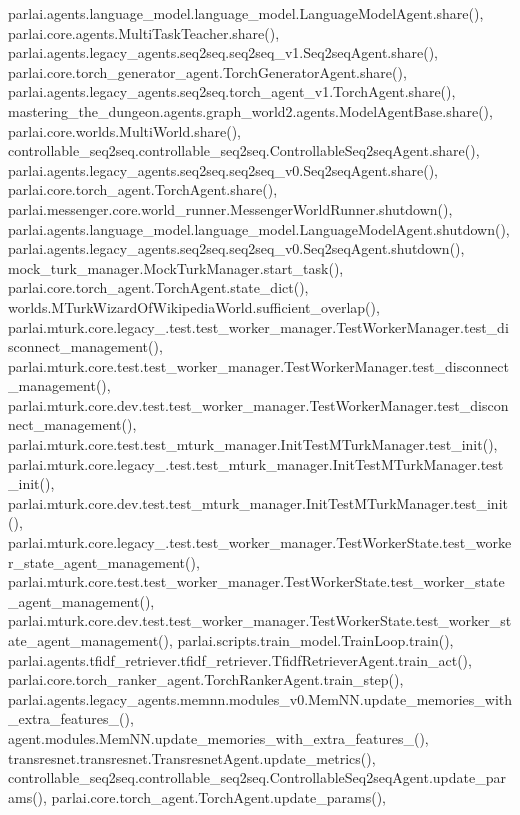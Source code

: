 parlai.\+agents.\+language\+\_\+model.\+language\+\_\+model.\+Language\+Model\+Agent.\+share(), parlai.\+core.\+agents.\+Multi\+Task\+Teacher.\+share(), parlai.\+agents.\+legacy\+\_\+agents.\+seq2seq.\+seq2seq\+\_\+v1.\+Seq2seq\+Agent.\+share(), parlai.\+core.\+torch\+\_\+generator\+\_\+agent.\+Torch\+Generator\+Agent.\+share(), parlai.\+agents.\+legacy\+\_\+agents.\+seq2seq.\+torch\+\_\+agent\+\_\+v1.\+Torch\+Agent.\+share(), mastering\+\_\+the\+\_\+dungeon.\+agents.\+graph\+\_\+world2.\+agents.\+Model\+Agent\+Base.\+share(), parlai.\+core.\+worlds.\+Multi\+World.\+share(), controllable\+\_\+seq2seq.\+controllable\+\_\+seq2seq.\+Controllable\+Seq2seq\+Agent.\+share(), parlai.\+agents.\+legacy\+\_\+agents.\+seq2seq.\+seq2seq\+\_\+v0.\+Seq2seq\+Agent.\+share(), parlai.\+core.\+torch\+\_\+agent.\+Torch\+Agent.\+share(), parlai.\+messenger.\+core.\+world\+\_\+runner.\+Messenger\+World\+Runner.\+shutdown(), parlai.\+agents.\+language\+\_\+model.\+language\+\_\+model.\+Language\+Model\+Agent.\+shutdown(), parlai.\+agents.\+legacy\+\_\+agents.\+seq2seq.\+seq2seq\+\_\+v0.\+Seq2seq\+Agent.\+shutdown(), mock\+\_\+turk\+\_\+manager.\+Mock\+Turk\+Manager.\+start\+\_\+task(), parlai.\+core.\+torch\+\_\+agent.\+Torch\+Agent.\+state\+\_\+dict(), worlds.\+M\+Turk\+Wizard\+Of\+Wikipedia\+World.\+sufficient\+\_\+overlap(), parlai.\+mturk.\+core.\+legacy\+\_.\+test.\+test\+\_\+worker\+\_\+manager.\+Test\+Worker\+Manager.\+test\+\_\+disconnect\+\_\+management(), parlai.\+mturk.\+core.\+test.\+test\+\_\+worker\+\_\+manager.\+Test\+Worker\+Manager.\+test\+\_\+disconnect\+\_\+management(), parlai.\+mturk.\+core.\+dev.\+test.\+test\+\_\+worker\+\_\+manager.\+Test\+Worker\+Manager.\+test\+\_\+disconnect\+\_\+management(), parlai.\+mturk.\+core.\+test.\+test\+\_\+mturk\+\_\+manager.\+Init\+Test\+M\+Turk\+Manager.\+test\+\_\+init(), parlai.\+mturk.\+core.\+legacy\+\_.\+test.\+test\+\_\+mturk\+\_\+manager.\+Init\+Test\+M\+Turk\+Manager.\+test\+\_\+init(), parlai.\+mturk.\+core.\+dev.\+test.\+test\+\_\+mturk\+\_\+manager.\+Init\+Test\+M\+Turk\+Manager.\+test\+\_\+init(), parlai.\+mturk.\+core.\+legacy\+\_.\+test.\+test\+\_\+worker\+\_\+manager.\+Test\+Worker\+State.\+test\+\_\+worker\+\_\+state\+\_\+agent\+\_\+management(), parlai.\+mturk.\+core.\+test.\+test\+\_\+worker\+\_\+manager.\+Test\+Worker\+State.\+test\+\_\+worker\+\_\+state\+\_\+agent\+\_\+management(), parlai.\+mturk.\+core.\+dev.\+test.\+test\+\_\+worker\+\_\+manager.\+Test\+Worker\+State.\+test\+\_\+worker\+\_\+state\+\_\+agent\+\_\+management(), parlai.\+scripts.\+train\+\_\+model.\+Train\+Loop.\+train(), parlai.\+agents.\+tfidf\+\_\+retriever.\+tfidf\+\_\+retriever.\+Tfidf\+Retriever\+Agent.\+train\+\_\+act(), parlai.\+core.\+torch\+\_\+ranker\+\_\+agent.\+Torch\+Ranker\+Agent.\+train\+\_\+step(), parlai.\+agents.\+legacy\+\_\+agents.\+memnn.\+modules\+\_\+v0.\+Mem\+N\+N.\+update\+\_\+memories\+\_\+with\+\_\+extra\+\_\+features\+\_\+(), agent.\+modules.\+Mem\+N\+N.\+update\+\_\+memories\+\_\+with\+\_\+extra\+\_\+features\+\_\+(), transresnet.\+transresnet.\+Transresnet\+Agent.\+update\+\_\+metrics(), controllable\+\_\+seq2seq.\+controllable\+\_\+seq2seq.\+Controllable\+Seq2seq\+Agent.\+update\+\_\+params(), parlai.\+core.\+torch\+\_\+agent.\+Torch\+Agent.\+update\+\_\+params(), 